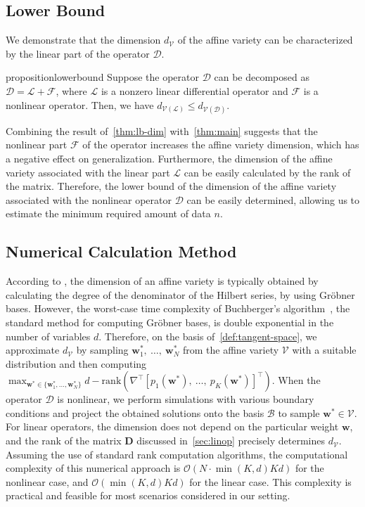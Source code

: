 \documentclass{article}
\def\mD{{\bm{D}}}
\theoremstyle{plain}
\theoremstyle{definition}
\theoremstyle{remark}
\begin{document}
\subsection{Lower Bound}
We demonstrate that the dimension \( d_{\mathcal{V}} \) of the affine variety can be characterized by the linear part of the operator \( \mathscr{D} \). 
\begin{restatable}{proposition}{lowerbound}
\label{thm:lb-dim}
Suppose the operator \( \mathscr{D} \) can be decomposed as \( \mathscr{D} = \mathscr{L} + \mathscr{F} \), where \( \mathscr{L} \) is a nonzero linear differential operator and \( \mathscr{F} \) is a nonlinear operator. Then, we have $d_{\mathcal{V}(\mathscr{L})} \leq d_{\mathcal{V}(\mathscr{D})}$.
\end{restatable}

Combining the result of~\cref{thm:lb-dim} with~\cref{thm:main} suggests that the nonlinear part \( \mathscr{F} \) of the operator increases the affine variety dimension, which has a negative effect on generalization. Furthermore, the dimension of the affine variety associated with the linear part \( \mathscr{L} \) can be easily calculated by the rank of the matrix. Therefore, the lower bound of the dimension of the affine variety associated with the nonlinear operator \( \mathscr{D} \) can be easily determined, allowing us to estimate the minimum required amount of data \( n \).

\subsection{Numerical Calculation Method}
\label{sec:dv-cal}
According to , the dimension of an affine variety is typically obtained by calculating the degree of the denominator of the Hilbert series, by using Gröbner bases. 
However, the worst-case time complexity of Buchberger's algorithm~\citep{buchberger1976theoretical}, the standard method for computing Gröbner bases, is double exponential in the number of variables \(d\). Therefore, on the basis of~\ref{def:tangent-space}, we approximate \(d_{\mathcal{V}}\) by sampling \(\bm{w}^*_{1},\ \ldots,\ \bm{w}^*_{N}\) from the affine variety \(\mathcal{V}\) with a suitable distribution and then computing \(\max_{\bm{w}^* \in \{\bm{w}^*_1,\ldots,\bm{w}^*_N\}} d-\mathrm{rank}\left(\nabla^{\top} [p_1(\bm{w}^*),\ \ldots,\ p_{K}(\bm{w}^*)]^{\top}\right)\). 
When the operator \(\mathscr{D}\) is nonlinear, we perform simulations with various boundary conditions and project the obtained solutions onto the basis \(\mathcal{B}\) to sample \(\bm{w}^* \in \mathcal{V}\). For linear operators, the dimension does not depend on the particular weight \(\bm{w}\), and the rank of the matrix \(\mD\) discussed in~\cref{sec:linop} precisely determines \(d_{\mathcal{V}}\). 
Assuming the use of standard rank computation algorithms, the computational complexity of this numerical approach is \(\mathcal{O}(N \cdot \min(K, d) K d)\) for the nonlinear case, and \(\mathcal{O}(\min(K, d) K d)\) for the linear case. This complexity is practical and feasible for most scenarios considered in our setting.
\end{document}
